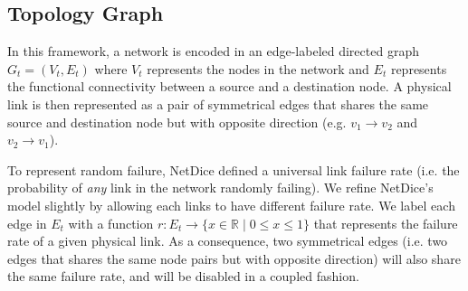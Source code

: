 \documentclass[10pt,sigconf,letterpaper,anonymous,nonacm]{acmart}
\begin{document}
\subsection{Topology Graph}
In this framework, a network is encoded in an edge-labeled directed graph 
$G_t = (V_t, E_t)$ where $V_t$ represents the nodes in the network and 
$E_t$ represents the functional connectivity between a source and a destination node. 
A physical link is then represented as a pair of symmetrical edges that shares the same source 
and destination node but with opposite direction (e.g. $v_1 \rightarrow v_2$ and $v_2 
\rightarrow v_1$).


To represent random failure, NetDice defined a universal link failure rate (i.e. 
the probability of \textit{any} link in the network randomly failing).
We refine NetDice's model slightly by allowing each links to have different failure rate.
We label each edge in $E_t$ with a function $r: E_t \rightarrow \{x \in \mathbb{R} \mid 0 \le x 
\le 1\}$ that represents the failure rate of a given physical link.
As a consequence, two symmetrical edges (i.e. two edges that shares the same node pairs but with 
opposite direction) will also share the same failure rate, and will be disabled in a coupled 
fashion.


\end{document}
